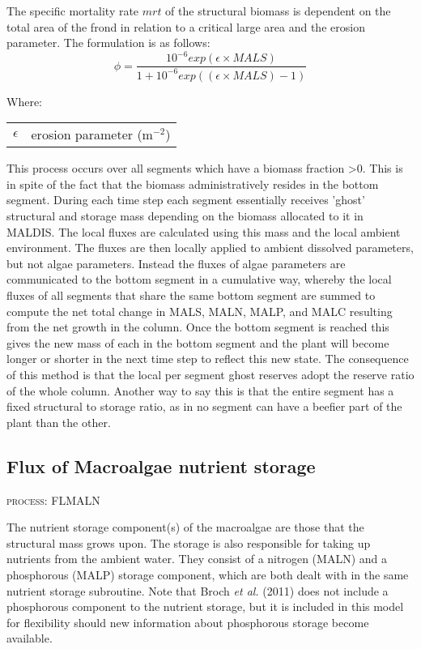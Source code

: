 \documentclass{deltares_manual}
\begin{document}
The specific mortality rate $mrt$ of the structural biomass is dependent on the total area of the frond in relation to a critical large area and the erosion parameter. The formulation is as follows:
\[\phi = \frac{10^{-6}exp(\epsilon\times MALS)}{1+10^{-6}exp((\epsilon\times MALS)-1)}\]

Where:\\
\begin{tabular}{ll}
$\epsilon$ & erosion parameter (m$^{-2}$)\\
\end{tabular}

This process occurs over all segments which have a biomass fraction \textgreater 0. This is in spite of the fact that the biomass administratively resides in the bottom segment. During each time step each segment essentially receives 'ghost' structural and storage mass depending on the biomass allocated to it in MALDIS. The local fluxes are calculated using this mass and the local ambient environment. The fluxes are then locally applied to ambient dissolved parameters, but not algae parameters. Instead the fluxes of algae parameters are communicated to the bottom segment in a cumulative way, whereby the local fluxes of all segments that share the same bottom segment are summed to compute the net total change in MALS, MALN, MALP, and MALC resulting from the net growth in the column. Once the bottom segment is reached this gives the new mass of each in the bottom segment and the plant will  become longer or shorter in the next time step to reflect this new state. The consequence of this method is that the local per segment ghost reserves adopt the reserve ratio of the whole column. Another way to say this is that the entire segment has a fixed structural to storage ratio, as in no segment can have a beefier part of the plant than the other.

\subsection{Flux of Macroalgae nutrient storage}
\begin{flushright}
\textsc{process: FLMALN}
\end{flushright}

The nutrient storage component(s) of the macroalgae are those that the structural mass grows upon. The storage is also responsible for taking up nutrients from the ambient water. They consist of a nitrogen (MALN) and a phosphorous (MALP) storage component, which are both dealt with in the same nutrient storage subroutine. Note that Broch \textit{et al.} (2011) does not include a phosphorous component to the nutrient storage, but it is included in this model for flexibility should new information about phosphorous storage become available.
\end{document}
